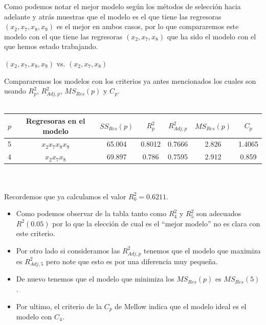\documentclass[11pt]{beamer}
\begin{document}
\begin{frame}
Como podemos notar el mejor modelo según los métodos de selección hacia adelante y atrás muestras que el modelo es el que tiene las regresoras $(x_{2},x_{7},x_{8},x_{9})$ es el mejor en ambos casos, por lo que compararemos este modelo con el que tiene las regresoras $(x_{2},x_{7},x_{8})$ que ha sido el modelo con el que hemos estado trabajando.
\end{frame}

\begin{frame}{$(x_{2},x_{7},x_{8},x_{9})$ vs. $(x_{2},x_{7},x_{8})$}

Compararemos los modelos con los criterios ya antes mencionados los cuales son usando $R^{2}_{p}$, $R^{2}_{Adj,p}$, $MS_{Res}(p)$ y $C_{p}$.\\~\\

\begin{adjustbox}{width=1\textwidth}
\begin{tabular}{ccccccc}
\hline 
$p$ & Regresoras en el modelo & $SS_{Res}(p)$ & $R_{p}^{2}$ & $R_{Adj,p}^{2}$ & $MS_{Res}(p)$ & $C_{p}$ \\ 
\hline 
5 & $x_{2}x_{7}x_{8}x_{9}$ & 65.004 & 0.8012 & 0.7666 & 2.826 & 1.4065 \\ 
4 & $x_{2}x_{7}x_{8}$ & 69.897 & 0.786  & 0.7595 & 2.912  & 0.859 \\ 
\hline 
\end{tabular} 
\end{adjustbox}\\~\\

Recordemos que ya calculamos el valor $R^{2}_{0}=0.6211$.

\end{frame}

\begin{frame}

\begin{itemize}
\justifying
\item[\textcolor{red}{\textbullet}] Como podemos observar de la tabla tanto como $R^{2}_{4}$ y $R^{2}_{5}$ son adecuados $R^{2}(0.05)$ por lo que la elección de cual es el ``mejor modelo'' no es clara con este criterio.

\item[\textcolor{red}{\textbullet}] Por otro lado si consideramos las $R^{2}_{Adj,p}$ tenemos que el modelo que maximiza es $R^{2}_{Adj,5}$ pero note que esto es por una diferencia muy pequeña.

\item[\textcolor{red}{\textbullet}] De nuevo tenemos que el modelo que minimiza los $MS_{Res}(p)$ es $MS_{Res}(5)$.

\item[\textcolor{red}{\textbullet}] Por ultimo, el criterio de la $C_{p}$ de Mellow indica que el modelo ideal es el modelo con $C_{4}$.

\end{itemize}

\end{frame}
\end{document}
